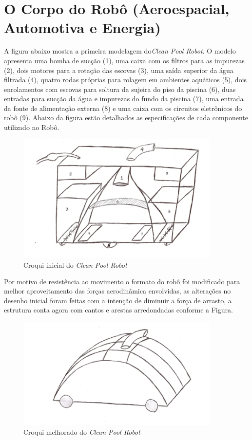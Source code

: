 \section{O Corpo do Robô (Aeroespacial, Automotiva e Energia)}
A figura abaixo mostra a primeira modelagem do\textit{Clean Pool Robot}. O modelo
apresenta uma bomba de sucção (1), uma caixa com os filtros para as impurezas
(2), dois motores para a rotação das escovas (3), uma saída superior da água
filtrada (4), quatro rodas próprias para rolagem em ambientes aquáticos (5),
dois enrolamentos com escovas para soltura da sujeira do piso da piscina (6),
duas entradas para sucção da água e impurezas do fundo da piscina (7), uma
entrada da fonte de alimentação externa (8) e uma caixa com os circuitos
eletrônicos do robô (9). Abaixo da figura estão detalhados as especificações
de cada componente utilizado no Robô.
\par
\begin{figure}[h]
  \centering
  \includegraphics[width=0.9\textwidth]{figures/croqui.png}
  \caption{ Croqui inicial do \textit{Clean Pool Robot}}
  \label{fig:initial_croqui}
\end{figure}
\FloatBarrier
\par
Por motivo de resistência ao movimento o formato do robô foi modificado para
melhor aproveitamento das forças aerodinâmica envolvidas, as alterações no
desenho inicial foram feitas com a intenção de diminuir a força de arrasto, a
estrutura conta agora com cantos e arestas arredondadas conforme a Figura.
\par
\begin{figure}[h]
  \centering
  \includegraphics[width=0.9\textwidth]{figures/better-croqui.png}
  \caption{ Croqui melhorado do \textit{Clean Pool Robot}}
  \label{fig:better-croqui}
\end{figure}
